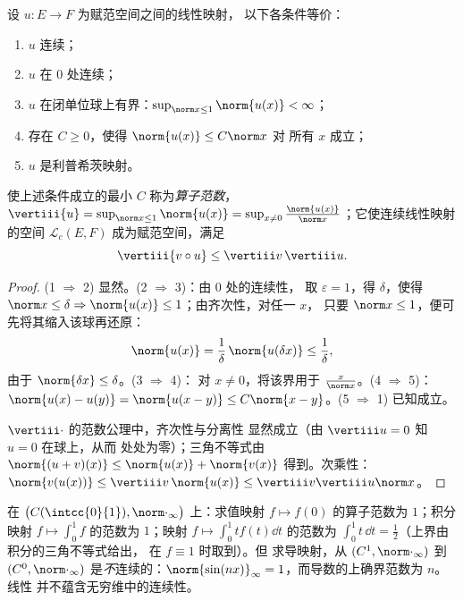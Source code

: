 \begin{theorem}[刻画]\label{thm:b2:nvs:continuouslinear}
设 $u \colon E \to F$ 为赋范空间之间的线性映射，
以下各条件等价：
\begin{enumerate}
  \item $u$ 连续；
  \item $u$ 在 $0$ 处连续；
  \item $u$ 在闭单位球上有界：$\sup_{\norm x \leq
        1} \norm{u(x)} < \infty$；
  \item 存在 $C \geq 0$，使得 $\norm{u(x)} \leq C \norm x$ 对
        所有 $x$ 成立；
  \item $u$ 是利普希茨映射。
\end{enumerate}
使上述条件成立的最小 $C$ 称为\emph{算子范数}，
$\vertiii{u} = \sup_{\norm x \leq 1}\norm{u(x)} = \sup_{x \neq 0}
\frac{\norm{u(x)}}{\norm x}$；它使连续线性映射的空间 $\mathcal{L}_c(E,
F)$ 成为赋范空间，满足
\[
\vertiii{v \circ u} \leq \vertiii v\, \vertiii u .
\]
\end{theorem}

\begin{proof}
(1 $\Rightarrow$ 2) 显然。(2 $\Rightarrow$ 3)：由 $0$ 处的连续性，
取 $\varepsilon = 1$，得 $\delta$，使得 $\norm x \leq \delta
\Rightarrow \norm{u(x)} \leq 1$；由齐次性，对任一 $x$，
只要 $\norm x \leq 1$，便可先将其缩入该球再还原：
\[
\norm{u(x)} = \frac1\delta\,\norm{u(\delta x)} \leq
\frac1\delta ,
\]
由于 $\norm{\delta x} \leq \delta$。(3 $\Rightarrow$ 4)：
对 $x \neq 0$，将该界用于 $\frac{x}{\norm x}$。(4
$\Rightarrow$ 5)：$\norm{u(x) - u(y)} = \norm{u(x - y)} \leq
C\norm{x - y}$。(5 $\Rightarrow$ 1) 已知成立。

$\vertiii\cdot$ 的范数公理中，齐次性与分离性
显然成立（由 $\vertiii u = 0$ 知 $u = 0$ 在球上，从而
处处为零）；三角不等式由 $\norm{(u + v)(x)} \leq
\norm{u(x)} + \norm{v(x)}$ 得到。次乘性：$\norm{v(u(x))}
\leq \vertiii v\,\norm{u(x)} \leq \vertiii v \vertiii u \norm x$。
\end{proof}

\begin{example}\label{ex:b2:nvs:operatornorms}
在 $\bigl(C(\intcc{0}{1}), \norm\cdot_\infty\bigr)$ 上：求值映射
$f \mapsto f(0)$ 的算子范数为 $1$；积分映射 $f \mapsto
\int_0^1 f$ 的范数为 $1$；映射 $f \mapsto \int_0^1 t f(t)\dd t$
的范数为 $\int_0^1 t\,\dd t = \frac12$（上界由积分的三角不等式给出，
在 $f \equiv 1$ 时取到）。但
求导映射，从 $(C^1, \norm\cdot_\infty)$ 到 $(C^0,
\norm\cdot_\infty)$ 是\emph{不}连续的：$\norm{\sin(nx)}_\infty
= 1$，而导数的上确界范数为 $n$。线性
并不蕴含无穷维中的连续性。
\end{example}

